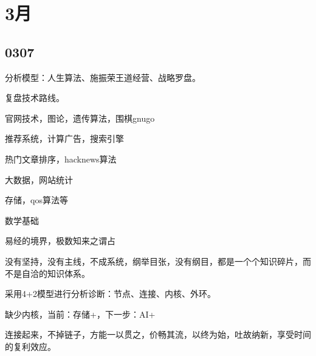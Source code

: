 \section{3月}

\subsection{0307}

分析模型：人生算法、施振荣王道经营、战略罗盘。

复盘技术路线。

官网技术，图论，遗传算法，围棋gnugo

推荐系统，计算广告，搜索引擎

热门文章排序，hacknews算法

大数据，网站统计

存储，qos算法等

数学基础

易经的境界，极数知来之谓占

没有坚持，没有主线，不成系统，纲举目张，没有纲目，都是一个个知识碎片，而不是自洽的知识体系。

采用4+2模型进行分析诊断：节点、连接、内核、外环。

缺少内核，当前：存储+，下一步：AI+

连接起来，不掉链子，方能一以贯之，价畅其流，以终为始，吐故纳新，享受时间的复利效应。
